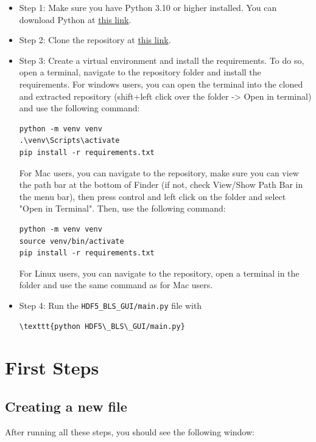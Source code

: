\documentclass{book}
\begin{document}
        \begin{itemize}
            \item Step 1: Make sure you have Python 3.10 or higher installed. You can download Python at \href{https://www.python.org/downloads/}{this link}.
            \item Step 2: Clone the repository at \href{https://github.com/bio-brillouin/HDF5_BLS/tree/main}{this link}.    
            \item Step 3: Create a virtual environment and install the requirements. To do so, open a terminal, navigate to the repository folder and install the requirements. For windows users, you can open the terminal into the cloned and extracted repository (shift+left click over the folder -> Open in terminal) and use the following command:
\begin{lstlisting}
python -m venv venv
.\venv\Scripts\activate
pip install -r requirements.txt
\end{lstlisting}
            For Mac users, you can navigate to the repository, make sure you can view the path bar at the bottom of Finder (if not, check View/Show Path Bar in the menu bar), then press control and left click on the folder and select "Open in Terminal". Then, use the following command:
\begin{lstlisting}
python -m venv venv
source venv/bin/activate
pip install -r requirements.txt
\end{lstlisting}
            For Linux users, you can navigate to the repository, open a terminal in the folder and use the same command as for Mac users.
            \item Step 4: Run the \texttt{HDF5\_BLS\_GUI/main.py} file with
\begin{lstlisting}
\texttt{python HDF5\_BLS\_GUI/main.py}
\end{lstlisting}
        \end{itemize}

    \section{First Steps}
        \subsection{Creating a new file}
            After running all these steps, you should see the following window:
\end{document}
